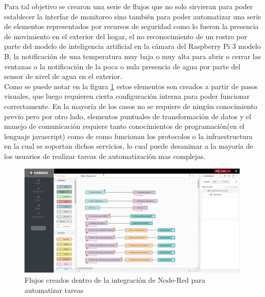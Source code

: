Para tal objetivo se crearon una serie de flujos que no solo sirvieran para poder establecer la interfaz de monitoreo sino también para poder automatizar una seríe de elementos representados por recursos de seguridad como lo fueron la presencia de movimiento en el exterior del hogar, el no reconocimiento de un rostro por parte del modelo de inteligencia artificial en la cámara del Raspberry Pi 3 modelo B, la notificación de una temperatura muy baja o muy alta para abrir o cerrar las ventanas o la notificación de la poca o nula presencia de agua por parte del sensor de nivel de agua en el exterior.\\

Como se puede notar en la figura \ref{fig:hamaca_nodered} estos elementos son creados a partir de pasos visuales, que luego requieren cierta configuración interna para poder funcionar correctamente. En la mayoría de los casos no se requiere de ningún conocimiento previo pero por otro lado, elementos puntuales de transformación de datos y el manejo de comunicación requiere tanto conocimientos de programación(en el lenguaje javascript) como de como funcionan los protocolos o la infraestructura en la cual se soportan dichos servicios, lo cual puede desanimar a la mayoría de los usuarios de realizar tareas de automatización mas complejas.
\begin{figure}[htb]
\centering
\includegraphics[scale=0.225]{./Figuras/hamaca_nodered.png}
\caption{Flujos creados dentro de la integración de Node-Red para automatizar tareas}
\label{fig:hamaca_nodered}
\vspace*{-10pt}
\end{figure}